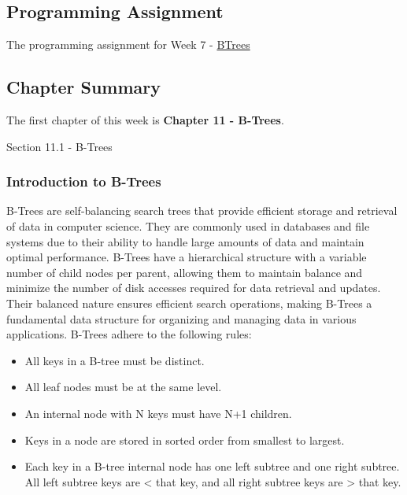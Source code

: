 \subsection{Programming Assignment}

The programming assignment for Week 7 - \href{https://github.com/QuantumCompiler/CU/tree/main/CSPB%202270%20-%20Data%20Structures/CSPB%202270%20-%20Programming%20Assignments/CSPB%202270%20-%20Assignment%205%20-%20B-Trees}{BTrees}

\subsection{Chapter Summary}

The first chapter of this week is \textbf{Chapter 11 - B-Trees}.

\begin{notes}{Section 11.1 - B-Trees}
    \subsubsection*{Introduction to B-Trees}

    B-Trees are self-balancing search trees that provide efficient storage and retrieval of data in computer science. They are commonly used in databases and file systems due to their ability to handle large amounts of data and maintain optimal performance. B-Trees have a hierarchical structure with a variable number of child nodes per parent, 
    allowing them to maintain balance and minimize the number of disk accesses required for data retrieval and updates. Their balanced nature ensures efficient search operations, making B-Trees a fundamental data structure for organizing and managing data in various applications. B-Trees adhere to the following rules:
    
    \begin{itemize}
        \item All keys in a B-tree must be distinct.
        \item All leaf nodes must be at the same level.
        \item An internal node with N keys must have N+1 children.
        \item Keys in a node are stored in sorted order from smallest to largest.
        \item Each key in a B-tree internal node has one left subtree and one right subtree. All left subtree keys are < that key, and all right subtree keys are > that key.
    \end{itemize}
    

\end{notes}
